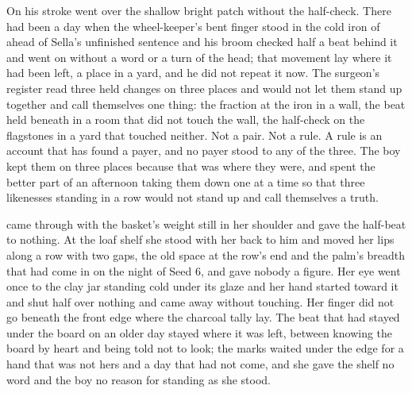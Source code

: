 On  his stroke went over the shallow bright patch without the half-check. There had been a day when the wheel-keeper's bent finger stood in the cold iron of  ahead of Sella's unfinished sentence and his broom checked half a beat behind it and went on without a word or a turn of the head; that movement lay where it had been left, a place in a yard, and he did not repeat it now. The surgeon's register read three held changes on three places and would not let them stand up together and call themselves one thing: the fraction at the iron in a wall, the beat held beneath  in a room that did not touch the wall, the half-check on the flagstones in a yard that touched neither. Not a pair. Not a rule. A rule is an account that has found a payer, and no payer stood to any of the three. The boy kept them on three places because that was where they were, and spent the better part of an afternoon taking them down one at a time so that three likenesses standing in a row would not stand up and call themselves a truth.

 came through with the basket's weight still in her shoulder and gave the half-beat to nothing. At the loaf shelf she stood with her back to him and moved her lips along a row with two gaps, the old space at the row's end and the palm's breadth that had come in on the night of Seed 6, and gave nobody a figure. Her eye went once to the clay jar standing cold under its glaze and her hand started toward it and shut half over nothing and came away without touching. Her finger did not go beneath the front edge where the charcoal tally lay. The beat that had stayed under the board on an older day stayed where it was left, between knowing the board by heart and being told not to look; the marks waited under the edge for a hand that was not hers and a day that had not come, and she gave the shelf no word and the boy no reason for standing as she stood.

